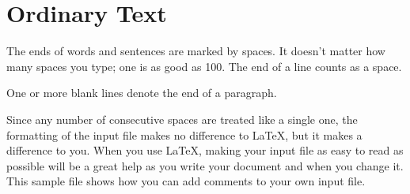 \documentclass{UniVieCS_PhD}
\begin{document}
    \Titlepage %
    \clearpage
	\pagebreak

	\tableofcontents
	
	\pagebreak
	
	
	

	\begin{abstract}
		This \LaTeX{} template provides example on how to format and display text, 
		mathematical formulas, and insert tables or images. There is a lot more you 
		can do with \LaTeX{}, for more information check out https://en.wikibooks.org/wiki/LaTeX.
	\end{abstract}
	
	\section{Ordinary Text}      %
	
	The ends  of words  and sentences are marked 
	by   spaces. It  doesn't matter how many 
	spaces    you type; one is as good as 100.  The
	end of   a line counts as a space.
	
	One   or more   blank lines denote the  end 
	of  a paragraph.  
	
	Since any number of consecutive spaces are treated
	like a single one, the formatting of the input
	file makes no difference to
	\LaTeX,                %
	but it makes a difference to you.  When you use
	\LaTeX\cite{lamport94},  %
	making your input file as easy to read
	as possible will be a great help as you write 
	your document and when you change it.  This sample 
	file shows how you can add comments to your own input 
	file.
	
\end{document}

